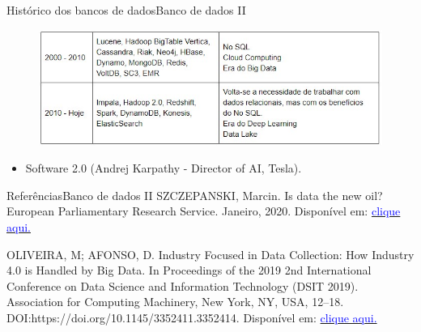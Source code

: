 \documentclass[t]{beamer}
\begin{document}
\begin{ftst}{Histórico dos bancos de dados}{Banco de dados II}

\begin{figure}
    \centering
    \includegraphics[scale=0.65]{Figuras/hist2.jpg}
\end{figure}

\begin{itemize}
    \item Software 2.0 (Andrej Karpathy - Director of AI, Tesla).
\end{itemize}

\end{ftst}



\begin{ftst}{Referências}{Banco de dados II}
\vone
\small
SZCZEPANSKI, Marcin. Is data the new oil? European Parliamentary Research Service. Janeiro, 2020. Disponível em: \href{https://www.europarl.europa.eu/RegData/etudes/BRIE/2020/646117/EPRS_BRI(2020)646117_EN.pdf.}{\textcolor{blue}{clique aqui.}}

\vone

OLIVEIRA, M; AFONSO, D. Industry Focused in Data Collection: How Industry 4.0 is Handled by Big Data. In Proceedings of the 2019 2nd International Conference on Data Science and Information Technology (DSIT 2019). Association for Computing Machinery, New York, NY, USA, 12–18. DOI:https://doi.org/10.1145/3352411.3352414. Disponível em: \href{https://dl.acm.org/doi/10.1145/3352411.3352414}{\textcolor{blue}{clique aqui.}}

\end{ftst}
\end{document}

